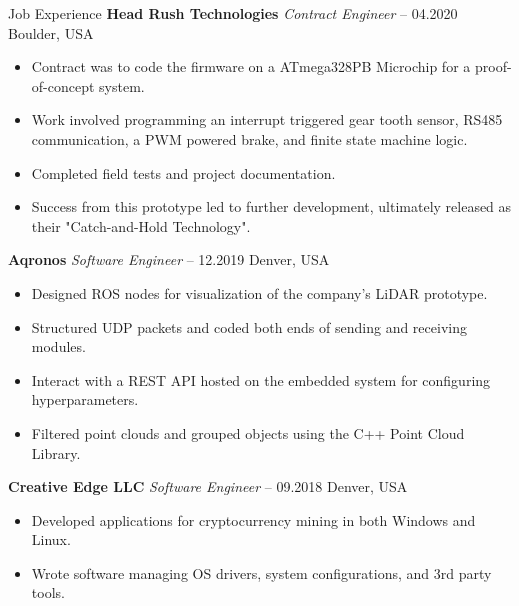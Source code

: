\begin{rubric}{Job Experience}
%
%
\entry*[] \textbf{Head Rush Technologies} \hfill \textit{Contract Engineer}  -- 04.2020 \hfill Boulder, USA \newline 
\vspace{\CVItemizeHeaderSpacing} \begin{itemize} %
	\setlength{\itemsep}{\CVItemizeSpacing}
	\item Contract was to code the firmware on a ATmega328PB Microchip for a proof-of-concept system.  
	\item Work involved programming an interrupt triggered gear tooth sensor, RS485 communication, a PWM powered brake, and finite state machine logic.  
	\item Completed field tests and project documentation.  
	\item Success from this prototype led to further development, ultimately released as their "Catch-and-Hold Technology".
\end{itemize}


%
%
\entry*[] \textbf{Aqronos} \hfill \textit{Software Engineer}  -- 12.2019 \hfill Denver, USA \newline
\vspace{\CVItemizeHeaderSpacing} \begin{itemize} %
	\setlength{\itemsep}{\CVItemizeSpacing}
	\item Designed ROS nodes for visualization of the company's LiDAR prototype.  
	\item Structured UDP packets and coded both ends of sending and receiving modules.
	\item Interact with a REST API hosted on the embedded system for configuring hyperparameters.
	\item Filtered point clouds and grouped objects using the C++ Point Cloud Library.  
\end{itemize}



%
%
\entry*[] \textbf{Creative Edge LLC} \hfill \textit{Software Engineer}  -- 09.2018 \hfill Denver, USA \newline
\vspace{\CVItemizeHeaderSpacing} \begin{itemize} %
	\setlength{\itemsep}{\CVItemizeSpacing}
	\item Developed applications for cryptocurrency mining in both Windows and Linux.  
	\item Wrote software managing OS drivers, system configurations, and 3rd party tools.
\end{itemize}

\end{rubric}
